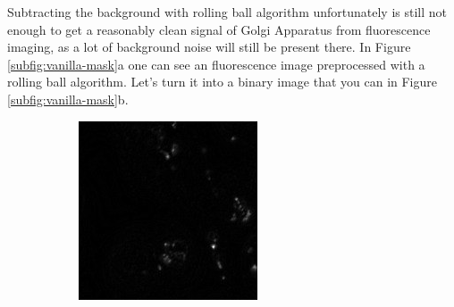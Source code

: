 Subtracting the background with rolling ball algorithm unfortunately is still not enough to get a reasonably clean signal of Golgi Apparatus from fluorescence imaging, as a lot of background noise will still be present there. In Figure \ref{subfig:vanilla-mask}a one can see an fluorescence image preprocessed with a rolling ball algorithm. Let's turn it into a binary image that you can in Figure \ref{subfig:vanilla-mask}b. 
\begin{figure}[htb]
	\centering
	\begin{subfigure}[b]{0.22\textwidth}
		\centering
		\includegraphics[width=\textwidth]{bilder/preprocessing/crop_golgi_not_full_processed.png}
		\caption{}
		\label{subfig:vanilla}
	\end{subfigure}
	\hfill
	\begin{subfigure}[b]{0.22\textwidth}
		\centering

\end{subfigure}
\end{figure}

